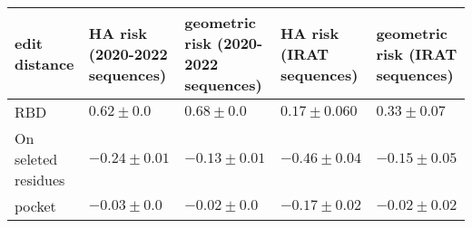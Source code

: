 \begin{tabular}{L{1in}|L{1in}|L{1in}|L{1in}|L{1in}}\hline
 edit  distance & HA  risk  (2020-2022  sequences) & geometric  risk  (2020-2022  sequences) & HA  risk  (IRAT  sequences) & geometric  risk  (IRAT  sequences) \\\hline
RBD&$0.62\pm0.0$&$0.68\pm0.0$&$0.17\pm0.060$&$0.33\pm0.07$\\\hline
 On  seleted  residues &$-0.24\pm0.01$&$-0.13\pm0.01$&$-0.46\pm0.04$&$-0.15\pm0.05$\\\hline
pocket&$-0.03\pm0.0$&$-0.02\pm0.0$&$-0.17\pm0.02$&$-0.02\pm0.02$\\\hline
\hline\end{tabular}
